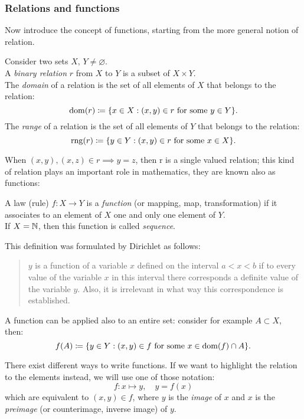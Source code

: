 \subsubsection{Relations and functions}

Now introduce the concept of functions, starting from the more general notion of relation.
\begin{defn}
	Consider two sets $X,\,Y \neq \varnothing $.\\
	A \emph{binary relation} $r$ from $X$ to $Y$ is a subset of $X \times Y$.\\
	The \emph{domain} of a relation is the set of all elements of $X$ that belongs to the relation:
	$$
		\operatorname{dom}(r) 
		\coloneqq \{x \in X: (x,y) \in r \text{ for some } y \in Y\}
	.
	$$
	The \emph{range} of a relation is the set of all elements of $Y$ that belongs to the relation:
	$$ 
		\operatorname{rng}(r) 
		\coloneqq \{y \in Y: (x,y) \in r \text{ for some } x \in X\}
	.
	$$
\end{defn}
When $(x,y), (x,z) \in r \implies y = z$, then r is a single valued relation; this kind of relation plays an important role in mathematics, they are known also as functions:
\begin{defn}\label{function}
	A law (rule) $f:X\to Y$ is a \emph{function} (or mapping, map, transformation) if it associates to an element of $X$ one and only one element of $Y$.\\
	If $X = \mathbb N$, then this function is called \emph{sequence}. 
\end{defn}

This definition was formulated by Dirichlet as follows:
\begin{quote}
	$y$ is a function of a variable $x$ defined on the interval $a<x<b$ if to every value of the variable $x$ in this interval there corresponds a definite value of the variable $y$.  Also, it is irrelevant in what way this correspondence is established.\footnotemark{}
\end{quote}

A function can be applied also to an entire set: consider for example $A \subset X$, then: 
$$
	f(A) 
	\coloneqq \{y \in Y: (x,y) \in f \text{ for some } x \in \operatorname{dom}(f)\cap A\}
.
$$

There exist different ways to write functions. If we want to highlight the relation to the elements instead, we will use one of those notation:
$$
	f:x\mapsto y, 
	\quad y=f\left(x\right)
$$
which are equivalent to $(x,y) \in f$, where $y$ is the \emph{image} of $x$ and $x$ is the \emph{preimage}\footnotemark{}
(or counterimage, inverse image)  of $y$.


